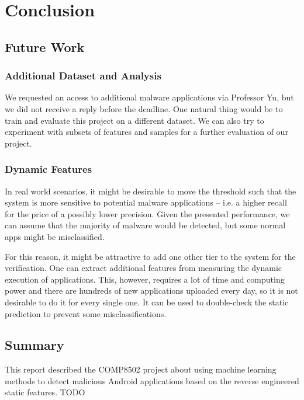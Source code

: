 \section{Conclusion}
\subsection{Future Work}
\subsubsection{Additional Dataset and Analysis}
We requested an access to additional malware applications via Professor Yu, but we did not receive a reply before the deadline. One natural thing would be to train and evaluate this project on a different dataset. We can also try to experiment with subsets of features and samples for a further evaluation of our project.

\subsubsection{Dynamic Features}
In real world scenarios, it might be desirable to move the threshold such that the system is more sensitive to potential malware applications -- i.e. a higher recall for the price of a possibly lower precision. Given the presented performance, we can assume that the majority of malware would be detected, but some normal apps might be misclassified.

For this reason, it might be attractive to add one other tier to the system for the verification. One can extract additional features from measuring the dynamic execution of applications. This, however, requires a lot of time and computing power and there are hundreds of new applications uploaded every day, so it is not desirable to do it for every single one. It can be used to double-check the static prediction to prevent some misclassifications.

\subsection{Summary}
This report described the COMP8502 project about using machine learning methods to detect malicious Android applications based on the reverse engineered static features. TODO